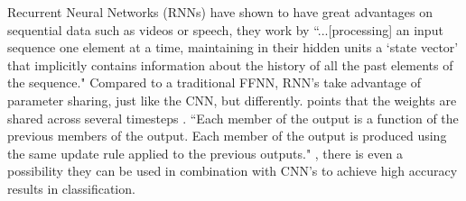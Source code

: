 \documentclass[report, 11pt, oneside]{dissertation}
\begin{document}
Recurrent Neural Networks (RNNs) have shown to have great advantages on sequential data such as videos or speech, they work by ``...[processing] an input sequence one element at a time, maintaining in their hidden units a `state vector' that implicitly contains information about the history of all the past elements of the sequence." \citep{LeCun:2015dt} Compared to a traditional FFNN, RNN's take advantage of parameter sharing, just like the CNN, but differently. \citeauthor{Goodfellow-et-al-2016} points that the weights are shared across several timesteps \citeyearpar{Goodfellow-et-al-2016}. ``Each member of the output is a function of the previous members of the output. Each member of the output is produced using the same update rule applied to the previous outputs." \citep{Goodfellow-et-al-2016}, there is even a possibility they can be used in combination with CNN's to achieve high accuracy results in classification. 
\end{document}
